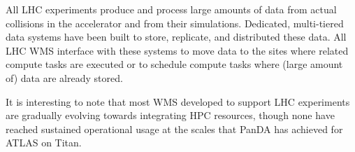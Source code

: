 All LHC experiments produce and process large amounts  of data from actual
collisions in the accelerator and from their simulations. Dedicated,
multi-tiered data systems have been built to store, replicate, and
distributed these data. All LHC WMS interface with these systems to move data
to the sites where related compute tasks are executed or to schedule compute
tasks where (large amount of) data are already stored.

It is interesting to note that most WMS developed to support LHC experiments
are gradually evolving towards integrating HPC resources, though none have
reached sustained operational usage at the scales that PanDA has achieved for
ATLAS on Titan.